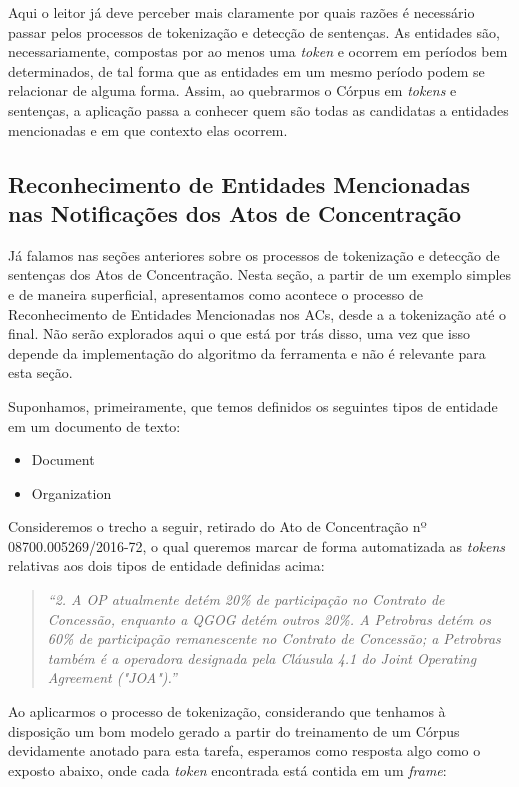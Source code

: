 \documentclass[11pt]{report}
\newcommand{\quotes}[1]{``#1''}
\begin{document}
Aqui o leitor já deve perceber mais claramente por quais razões é necessário passar pelos processos de tokenização e detecção de sentenças. As entidades são, necessariamente,
compostas por ao menos uma \textit{token} e ocorrem em períodos bem determinados, de tal forma que as entidades em um mesmo período podem se relacionar de alguma forma. Assim,
ao quebrarmos o Córpus em \textit{tokens} e sentenças, a aplicação passa a conhecer quem são todas as candidatas a entidades mencionadas e em que contexto elas ocorrem.

\subsection{Reconhecimento de Entidades Mencionadas nas Notificações dos Atos de Concentração}

\indent\indent Já falamos nas seções anteriores sobre os processos de tokenização e detecção de sentenças dos Atos de Concentração. Nesta seção, a partir de um exemplo simples e
de maneira superficial, apresentamos como acontece o processo de Reconhecimento de Entidades Mencionadas nos ACs, desde a a tokenização até o final. Não serão explorados aqui
o que está por trás disso, uma vez que isso depende da implementação do algoritmo da ferramenta e não é relevante para esta seção.

Suponhamos, primeiramente, que temos definidos os seguintes tipos de entidade em um documento de texto:

\begin{itemize}
  \item Document
  \item Organization
\end{itemize}

Consideremos o trecho a seguir, retirado do Ato de Concentração nº 08700.005269/2016-72, o qual queremos marcar de forma automatizada as \textit{tokens} relativas
aos dois tipos de entidade definidas acima:

\begin{quote}
  \textit{\quotes{2. A OP atualmente detém 20\% de participação no Contrato de Concessão, enquanto a QGOG detém outros 20\%.
  A Petrobras detém os 60\% de participação remanescente no Contrato de Concessão; a Petrobras também é a operadora designada
  pela Cláusula 4.1 do Joint Operating Agreement ("JOA").}}
\end{quote}

Ao aplicarmos o processo de tokenização, considerando que tenhamos à disposição um bom modelo gerado a partir do treinamento de um Córpus devidamente anotado para esta tarefa,
esperamos como resposta algo como o exposto abaixo, onde cada \textit{token} encontrada está contida em um \textit{frame}:
\end{document}
